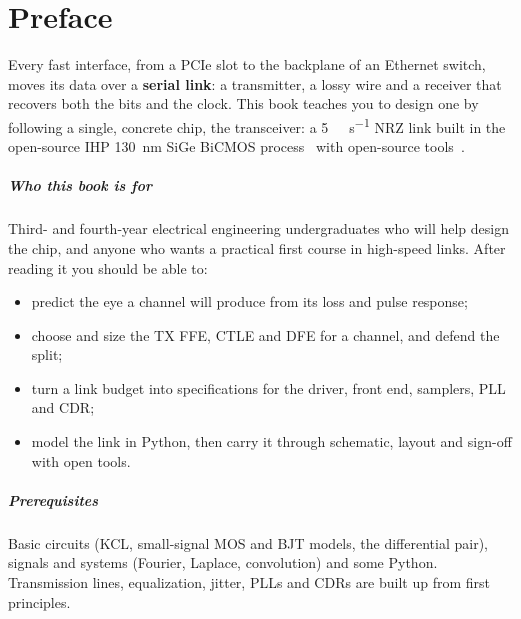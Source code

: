 \chapter{Preface}\label{ch:preface}

Every fast interface, from a PCIe slot to the backplane of an Ethernet switch, moves its data over a \textbf{serial link}: a transmitter, a lossy wire and a receiver that recovers both the bits and the clock. This book teaches you to design one by following a single, concrete chip, the \textbf{\OS{}} transceiver: a \qty{5}{\giga\bit\per\second} NRZ link built in the open-source IHP \sgx{} \qty{130}{\nano\meter} SiGe BiCMOS process~\cite{ihppdk} with open-source tools~\cite{iicosic}.

\paragraph{Who this book is for} Third- and fourth-year electrical engineering undergraduates who will help design the \OS{} chip, and anyone who wants a practical first course in high-speed links. After reading it you should be able to:
\begin{itemize}
  \item predict the eye a channel will produce from its loss and pulse response;
  \item choose and size the TX FFE, CTLE and DFE for a channel, and defend the split;
  \item turn a link budget into specifications for the driver, front end, samplers, PLL and CDR;
  \item model the link in Python, then carry it through schematic, layout and sign-off with open tools.
\end{itemize}

\paragraph{Prerequisites} Basic circuits (KCL, small-signal MOS and BJT models, the differential pair), signals and systems (Fourier, Laplace, convolution) and some Python. Transmission lines, equalization, jitter, PLLs and CDRs are built up from first principles.

